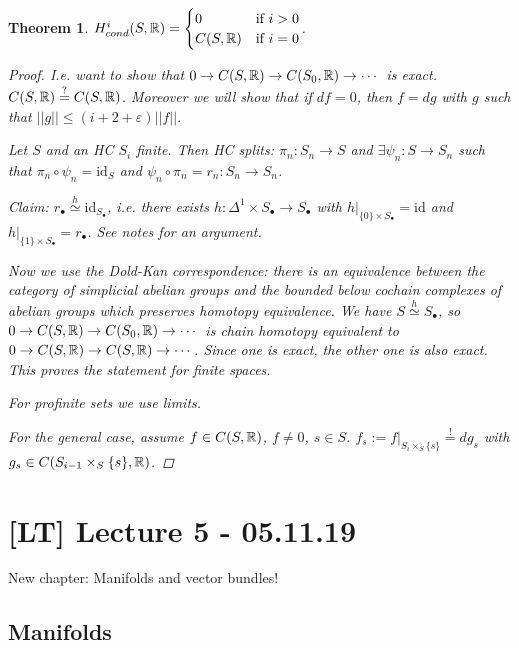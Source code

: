 \documentclass[A4paper, british]{amsart}
\theoremstyle{darkgreentheorem}
\newtheorem{thm}{Theorem}[section]
\theoremstyle{darkbluedefinition}
\theoremstyle{darkredexample}
\theoremstyle{remark}
\newcommand{\1}{\mathbbm{1}}
\newcommand{\fp}[1]{\times_{#1}}
\newcommand{\id}{\mathrm{id}}
\begin{document}
\begin{thm}
    $H^{i}_{cond}(S,\mathbb{R})=\begin{cases} 0 & \text{if } i>0 \\ C(S,\mathbb{R}) & \text{if } i=0 \end{cases}$.
	\begin{proof}
	    I.e. want to show that $0\to C(S,\mathbb{R})\to C(S_{0},\mathbb{R})\to \cdots $ is exact.
	    $C(S,\mathbb{R})\overset{?}{=} C(S,\mathbb{R})$.
	    Moreover we will show that if $df=0$, then $f=dg$ with $g$ such that $||g||\leqslant (i+2+\varepsilon )||f||$.

	    Let $S$ and an HC $S_{i}$ finite.
	    Then HC splits: $\pi_{n}\colon S_{n}\to S$ and $\exists \psi_{n}\colon S\to S_{n}$ such that $\pi_{n}\circ \psi_{n}=\id_{S}$ and $\psi_{n}\circ \pi_{n}=r_{n}\colon S_{n}\to S_{n}$.

	    Claim: $r_{\bullet}\overset{h}{\simeq} \id_{S_{\bullet}}$, i.e. there exists $h\colon \Delta^{1}\times S_{\bullet}\to S_{\bullet}$ with $h|_{\{0\}\times S_{\bullet}}=\id$ and $h|_{\{ 1\}\times S_{\bullet}}=r_{\bullet}$.
	    See notes for an argument.

	    Now we use the Dold-Kan correspondence: there is an equivalence between the category of simplicial abelian groups and the bounded below cochain complexes of abelian groups which preserves homotopy equivalence.
	    We have $S\overset{h}{\simeq}S_{\bullet}$, so $0\to C(S,\mathbb{R})\to C(S_{0},\mathbb{R})\to \cdots$ is chain homotopy equivalent to $0\to C(S,\mathbb{R})\to C(S,\mathbb{R})\to \cdots$.
	    Since one is exact, the other one is also exact.
	    This proves the statement for finite spaces.

	    For profinite sets we use limits.

	    For the general case, assume $f\in C(S,\mathbb{R})$, $f\neq 0$, $s\in S$.
	    $f_{s}:=f|_{S_{i}\fp{S}\{s\}}\overset{!}{=}dg_{s}$ with $g_{s}\in C(S_{i-1}\fp{S}\{s\},\R)$.
	\end{proof}
\end{thm}

\section{[LT] Lecture 5 - 05.11.19}

New chapter: Manifolds and vector bundles!

\subsection{Manifolds}
\end{document}
